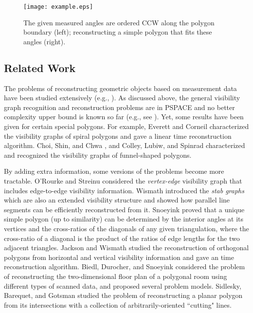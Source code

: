 \documentclass[11pt]{article}
\begin{document}
\begin{figure}[t]
\begin{minipage}[t]{\linewidth}
\begin{center}
\texttt{[image: example.eps]}
\caption{\footnotesize The given measured angles are ordered CCW along
the polygon boundary (left); reconstructing a simple polygon that fits these angles (right).
}\label{fig:example}
\end{center}
\end{minipage}
\end{figure}


\subsection{Related Work}

The problems of reconstructing geometric objects based on measurement
data have been studied extensively (e.g.,
\cite{ref:BiedlRe09,ref:BiloRe09,ref:JacksonOr02,ref:SidleskyPo06,ref:SnoeyinkCr99}).
As discussed above, the general visibility graph recognition and
reconstruction problems are in PSPACE \cite{ref:EverettVi90} and no better
complexity upper bound is known so far (e.g., see \cite{ref:EverettNe95}). 
Yet, some results have been given for certain special polygons. 
For example, Everett and
Corneil \cite{ref:ErerettRe90} characterized the visibility graphs of 
spiral polygons and
gave a linear time reconstruction algorithm. Choi, Shin, and Chwa
\cite{ref:ChoiCh95}, and Colley, Lubiw, and Spinrad
\cite{ref:ColleyVi97} characterized and
recognized the visibility graphs of funnel-shaped polygons. 

By adding extra information, some versions of the problems become more tractable. 
O'Rourke and Streinu \cite{ref:ORourkeTh98} considered the {\em
vertex-edge} visibility graph that includes edge-to-edge visibility
information. Wismath \cite{ref:WismathPo00} 
introduced the {\em stab graphs} which are
also an extended visibility structure and showed how parallel line
segments can be efficiently reconstructed from it. 
Snoeyink \cite{ref:SnoeyinkCr99} proved that a unique simple
polygon (up to similarity) can be determined by the interior angles at
its vertices and the cross-ratios of the diagonals of any given
triangulation, where the cross-ratio of a diagonal is the product of
the ratios of edge lengths for the two adjacent triangles. 
Jackson and Wismath \cite{ref:JacksonOr02} studied the reconstruction
of orthogonal polygons from horizontal and vertical visibility
information and gave an  time reconstruction algorithm. 
Biedl, Durocher, and Snoeyink \cite{ref:BiedlRe09} considered the problem of
reconstructing the two-dimensional floor plan of a polygonal room
using different types of scanned data, and proposed several problem models.
Sidlesky, Barequet, and Gotsman
\cite{ref:SidleskyPo06} studied the problem of reconstructing a planar
polygon from its intersections with a collection of
arbitrarily-oriented ``cutting" lines. 
\end{document}

